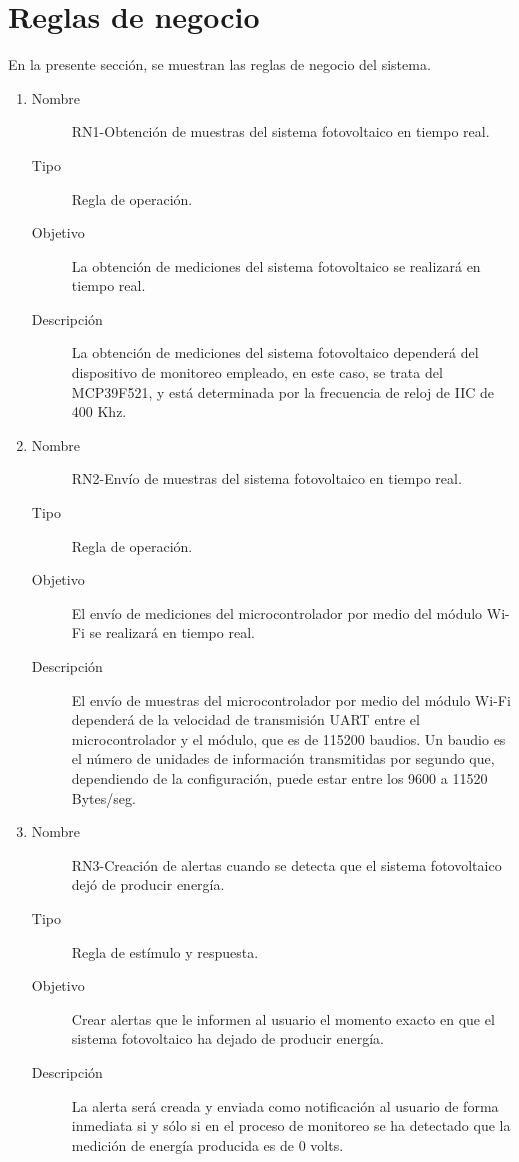 \section{Reglas de negocio}
En la presente sección, se muestran las reglas de negocio del sistema.
\begin{enumerate}[label=RN\arabic*.]
    \item \label{RN1}
		\begin{description}
			\item[Nombre] RN1-Obtención de muestras del sistema fotovoltaico en tiempo real.
			\item[Tipo] Regla de operación.
			\item[Objetivo] La obtención de mediciones del sistema fotovoltaico se realizará en tiempo real.
			\item[Descripción] La obtención de mediciones del sistema fotovoltaico dependerá del dispositivo de monitoreo empleado, en este caso, se trata del MCP39F521, y está determinada por la frecuencia de reloj de IIC de 400 Khz.
    		\end{description}
    		
\item \label{RN2}
	\begin{description}
		\item[Nombre] RN2-Envío de muestras del sistema fotovoltaico en tiempo real.
		\item[Tipo] Regla de operación.
		\item[Objetivo] El envío de mediciones del microcontrolador por medio del módulo Wi-Fi se realizará en tiempo real.
		\item[Descripción] El envío de muestras del microcontrolador por medio del módulo Wi-Fi dependerá de la velocidad de transmisión UART entre el microcontrolador y el módulo, que es de 115200 baudios. Un baudio es el número de unidades de información transmitidas por segundo que, dependiendo de la configuración, puede estar entre los 9600 a 11520 Bytes/seg.
		\end{description}	
		
    \item \label{RN3}
		\begin{description}
			\item[Nombre] RN3-Creación de alertas cuando se detecta que el sistema fotovoltaico dejó de producir energía.
			\item[Tipo] Regla de estímulo y respuesta.
			\item[Objetivo] Crear alertas que le informen al usuario el momento exacto en que el sistema fotovoltaico ha dejado de producir energía.
			\item[Descripción] La alerta será creada y enviada como notificación al usuario de forma inmediata si y sólo si en el proceso de monitoreo se ha detectado que la medición de energía producida es de 0 volts.  
    		\end{description}
    		

\end{enumerate}
